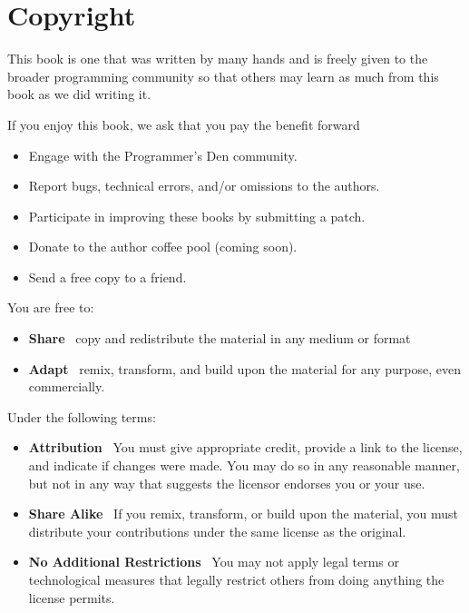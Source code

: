\documentclass[../main.tex]{subfiles}
\begin{document}
\newcommand*{\csp}{\hspace{0.15\textwidth}}

\chapter{Copyright}

This book is one that was written by many hands and is freely
given to the broader programming community so that others may learn as
much from this book as we did writing it.

\vspace{0.5cm}

If you enjoy this book, we ask that you pay the benefit forward \textemdash
\begin{itemize}
    \item Engage with the Programmer's Den community.
    \item Report bugs, technical errors, and/or omissions to the authors.
    \item Participate in improving these books by submitting a patch.
    \item Donate to the author coffee pool (coming soon).
    \item Send a free copy to a friend.
\end{itemize}

\vspace{1cm}

You are free to:
\begin{itemize}
    \item \textbf{Share} \textemdash\  copy and redistribute the
        material in any medium or format
        
    \item \textbf{Adapt} \textemdash\  remix, transform, and build
        upon the material for any purpose, even commercially.
\end{itemize}

\vspace{0.5cm}

Under the following terms:
\begin{itemize}
    \item \textbf{Attribution} \textemdash\  You must give appropriate
        credit, provide a link to the license, and indicate if changes
        were made. You may do so in any reasonable manner, but not in
        any way that suggests the licensor endorses you or your use.
    
    \item \textbf{Share Alike} \textemdash\  If you remix, transform, or
        build upon the material, you must distribute your contributions
        under the same license as the original.
    
    \item \textbf{No Additional Restrictions} \textemdash\  You may not
        apply legal terms or technological measures that legally restrict
        others from doing anything the license permits.
\end{itemize}
\end{document}
